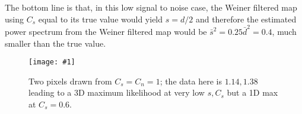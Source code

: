 \documentclass[11pt, oneside]{article}   	%
\newcommand{\sfig}[2]{
\texttt{[image: \#1]}
        }
\newcommand{\Spng}[2]{
   \begin{figure}[thbp]
   \begin{center}
    \sfig{#1.png}{0.7\columnwidth}
    \caption{{\small #2}}
    \label{fig:#1}
     \end{center}
   \end{figure}
}
\begin{document}
The bottom line is that, in this low signal to noise case, the Weiner filtered map using $C_s$ equal to its true value would yield $s=d/2$ and therefore the estimated power spectrum from the Weiner filtered map would be $\bar s^2=0.25\bar d^2 = 0.4$, much smaller than the true value.

\Spng{3d}{Two pixels drawn from $C_s=C_n=1$; the data here is $1.14,1.38$ leading to a 3D maximum likelihood at very low $s,C_s$ but a 1D max at $C_s=0.6$.}
\end{document}
